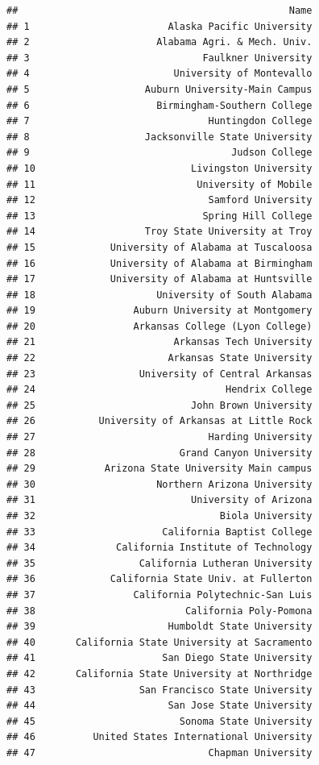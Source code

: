 \documentclass[]{article}
\begin{document}
\begin{verbatim}
##                                               Name
## 1                        Alaska Pacific University
## 2                      Alabama Agri. & Mech. Univ.
## 3                              Faulkner University
## 4                         University of Montevallo
## 5                    Auburn University-Main Campus
## 6                      Birmingham-Southern College
## 7                               Huntingdon College
## 8                    Jacksonville State University
## 9                                   Judson College
## 10                           Livingston University
## 11                            University of Mobile
## 12                              Samford University
## 13                             Spring Hill College
## 14                   Troy State University at Troy
## 15             University of Alabama at Tuscaloosa
## 16             University of Alabama at Birmingham
## 17             University of Alabama at Huntsville
## 18                     University of South Alabama
## 19                 Auburn University at Montgomery
## 20                 Arkansas College (Lyon College)
## 21                        Arkansas Tech University
## 22                       Arkansas State University
## 23                  University of Central Arkansas
## 24                                 Hendrix College
## 25                           John Brown University
## 26           University of Arkansas at Little Rock
## 27                              Harding University
## 28                         Grand Canyon University
## 29            Arizona State University Main campus
## 30                     Northern Arizona University
## 31                           University of Arizona
## 32                                Biola University
## 33                      California Baptist College
## 34              California Institute of Technology
## 35                  California Lutheran University
## 36             California State Univ. at Fullerton
## 37                 California Polytechnic-San Luis
## 38                          California Poly-Pomona
## 39                       Humboldt State University
## 40       California State University at Sacramento
## 41                      San Diego State University
## 42       California State University at Northridge
## 43                  San Francisco State University
## 44                       San Jose State University
## 45                         Sonoma State University
## 46          United States International University
## 47                              Chapman University

\end{verbatim}
\end{document}
